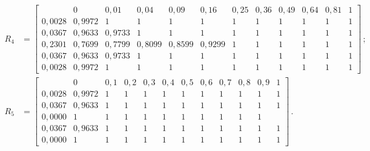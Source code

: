 \noindent

{\footnotesize

\begin{align*}

R_4 &=\left[

\begin{array}{c|ccccccccccc}

&0&0{,}01& 0{,}04& 0{,}09& 0{,}16& 0{,}25& 0{,}36& 0{,}49& 0{,}64& 

0{,}81&1\\

\hline

0{,}0028& 0{,}9972& 1&1&1&1&1& 1&1&1&1&1\\

0{,}0367& 0{,}9633& 0{,}9733&1&1&1&1&1&1&1&1&1\\

0{,}2301& 0{,}7699& 0{,}7799& 

0{,}8099&0{,}8599&0{,}9299&1&1&1&1&1&1\\

0{,}0367 & 0{,}9633& 0{,}9733&1&1&1&1& 1&1&1&1&1\\

0{,}0028 & 0{,}9972& 1&1&1&1&1& 1&1&1&1&1

\end{array}\right]\,;

\\[1pt]

R_5&= \left[

\begin{array}{c|ccccccccccc}

&0&0{,}1& 0{,}2& 0{,}3& 0{,}4& 0{,}5& 0{,}6& 0{,}7& 0{,}8& 0{,}9&1\\

\hline

0{,}0028& 0{,}9972& 1&1&1&1&1& 1&1&1&1&1\\

0{,}0367& 0{,}9633& 1&1&1&1&1&1&1&1&1&1\\

0{,}0000& 1& 1& 1& 1&1&1&1&1&1&1\\

0{,}0367 & 0{,}9633& 1&1&1&1&1& 1&1&1&1&1\\

0{,}0000 & 1& 1&1&1&1&1& 1&1&1&1&1

\end{array}

\right]\,.

\\[1pt]


\end{align*}}

